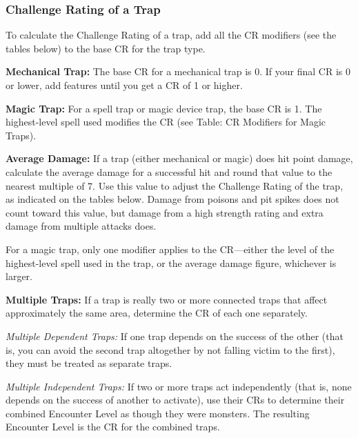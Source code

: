 \documentclass{article}
\begin{document}
\vspace{12pt}
\subsubsection*{\textbf{Challenge Rating of a Trap}}

To calculate the Challenge Rating of a trap, add all the CR modifiers (see the 
tables below) to the base CR for the trap type.

\textbf{Mechanical Trap: }The base CR for a mechanical trap is 0. If your final 
CR is 0 or lower, add features until you get a CR of 1 or higher.

\textbf{Magic Trap:} For a spell trap or magic device trap, the base CR is 1. The 
highest-level spell used modifies the CR (see Table: CR Modifiers for Magic Traps).

\textbf{Average Damage:} If a trap (either mechanical or magic) does hit point 
damage, calculate the average damage for a successful hit and round that value 
to the nearest multiple of 7. Use this value to adjust the Challenge Rating of 
the trap, as indicated on the tables below. Damage from poisons and pit spikes 
does not count toward this value, but damage from a high strength rating and extra 
damage from multiple attacks does.

For a magic trap, only one modifier applies to the CR---either the level of the 
highest-level spell used in the trap, or the average damage figure, whichever is 
larger.

\textbf{Multiple Traps: }If a trap is really two or more connected traps that affect 
approximately the same area, determine the CR of each one separately.

\textit{Multiple Dependent Traps: }If one trap depends on the success of the other 
(that is, you can avoid the second trap altogether by not falling victim to the 
first), they must be treated as separate traps.

\textit{Multiple Independent Traps: }If two or more traps act independently (that 
is, none depends on the success of another to activate), use their CRs to determine 
their combined Encounter Level as though they were monsters\textit{. }The resulting 
Encounter Level is the CR for the combined traps.
\end{document}
